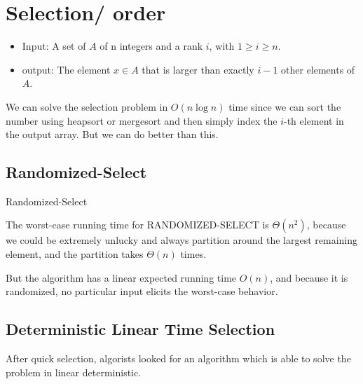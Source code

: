 \documentclass[en,hazy,blue,screen,14pt]{elegantnote}
\begin{document}
\section{Selection/ order}
\begin{itemize}
\item Input: A set of $A$ of n integers and a rank $i$, with $1\ge i\ge n$.
\item output: The element $x\in A$ that is larger than exactly $i-1$ other
elements of $A$.
\end{itemize}
We can solve the selection problem in $O(n\log n)$ time since we
can sort the number using heapsort or mergesort and then simply index
the $i$-th element in the output array. But we can do better than this.

\subsection{Randomized-Select}
\begin{algorithm}[H]

 \caption{Randomized-Select}
\end{algorithm}
The worst-case running time for RANDOMIZED-SELECT is $\Theta(n^2)$, because we 
could be extremely unlucky and always partition around the largest remaining 
element, and the partition takes $\Theta(n)$ times.

But the algorithm has a linear expected running time $O(n)$, and because it is 
randomized, no particular input elicits the worst-case behavior.
\subsection{Deterministic Linear Time Selection}
After quick selection, algorists looked for an algorithm which is able to solve 
the problem in linear deterministic.
\end{document}

